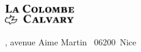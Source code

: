 \begin{titlepage}
\begin{center}
\mbox{}
\vfill
{}
\vfill
\enlargethispage{\footskip}
\includegraphics[width=3cm]{colombecalvary.pdf}

, avenue Aime Martin \mybullet~06200~Nice
\end{center}
\end{titlepage}
\pagebreak

